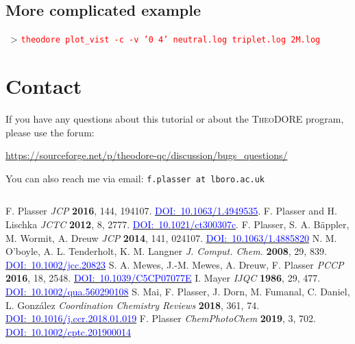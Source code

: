 \documentclass[DIV=12,headings=normal]{scrartcl}
\newcommand{\redl}[1]{{\textcolor{red}{\texttt{#1}}}}
\newcommand{\doi}[1]{\href{http://dx.doi.org/#1}{\textcolor{blue}{DOI:~#1}}}
\newcommand{\comm}[1]{
\small
~> \redl{#1}
\normalsize
}
\begin{document}
\subsection{More complicated example}
\comm{theodore plot\_vist -c -v '0 4' neutral.log triplet.log 2M.log}

\section{Contact}
If you have any questions about this tutorial or about the \textsc{TheoDORE} program, please use the forum:

\url{https://sourceforge.net/p/theodore-qc/discussion/bugs_questions/}

You can also reach me via email: \texttt{f.plasser at lboro.ac.uk}

\scriptsize
\begin{Verbatim}[commandchars=\\\{\}]

\end{Verbatim}
\normalsize


\begin{thebibliography}{9}
 F. Plasser \textit{JCP} \textbf{2016}, 144, 194107. \doi{10.1063/1.4949535}.
 F. Plasser and H. Lischka \textit{JCTC} \textbf{2012}, 8, 2777. \doi{10.1021/ct300307c}.
 F. Plasser, S. A. B\"appler, M. Wormit, A. Dreuw \textit{JCP} \textbf{2014}, 141, 024107. \doi{10.1063/1.4885820}
 N. M. O’boyle, A. L. Tenderholt, K. M. Langner \textit{J. Comput. Chem.} \textbf{2008}, 29, 839. \doi{10.1002/jcc.20823}
 S. A. Mewes, J.-M. Mewes, A. Dreuw, F. Plasser \textit{PCCP} \textbf{2016}, 18, 2548. \doi{10.1039/C5CP07077E}
 I. Mayer \textit{IJQC} \textbf{1986}, 29, 477. \doi{10.1002/qua.560290108}
 S. Mai, F. Plasser, J. Dorn, M. Fumanal, C. Daniel, L. Gonz\'{a}lez \textit{Coordination Chemistry Reviews} \textbf{2018}, 361, 74. \doi{10.1016/j.ccr.2018.01.019}
 F. Plasser \textit{ChemPhotoChem} \textbf{2019}, 3, 702. \doi{10.1002/cptc.201900014}
\end{thebibliography}
\end{document}
